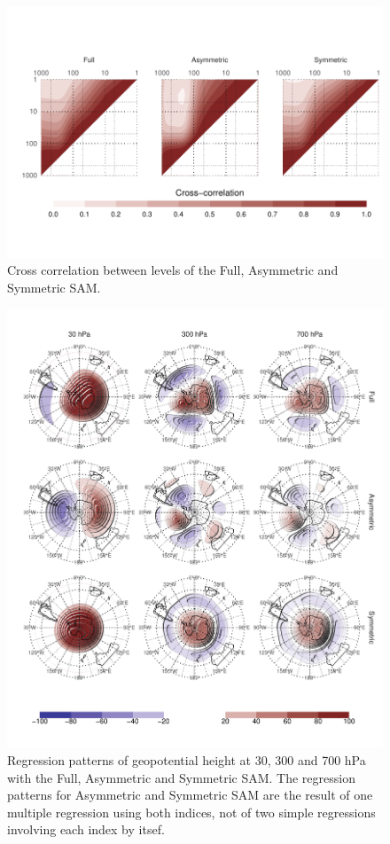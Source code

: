 \documentclass[]{ametsocV5}
\begin{document}
\begin{figure}
\includegraphics{cross-correlation-1} \caption[Cross correlation between levels of the Full, Asymmetric and Symmetric SAM]{Cross correlation between levels of the Full, Asymmetric and Symmetric SAM.}\label{fig:cross-correlation}
\end{figure}

\begin{figure}
\includegraphics{2d-regr-1} \caption[Regression patterns of geopotential height at 30, 300 and 700 hPa with the Full, Asymmetric and Symmetric SAM]{Regression patterns of geopotential height at 30, 300 and 700 hPa with the Full, Asymmetric and Symmetric SAM. The regression patterns for Asymmetric and Symmetric SAM are the result of one multiple regression using both indices, not of two simple regressions involving each index by itsef.}\label{fig:2d-regr}
\end{figure}
\end{document}
